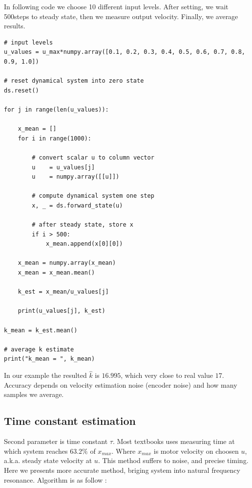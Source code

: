 \documentclass[12pt,twoside,onecolumn,openany,extrafontsizes,dvipsnames]{memoir}
\begin{document}
            In following code we choose 10 different input levels. After setting, we wait 500steps
            to steady state, then we measure output velocity. Finally, we average results.

            \begin{lstlisting}[style=python_style]
# input levels
u_values = u_max*numpy.array([0.1, 0.2, 0.3, 0.4, 0.5, 0.6, 0.7, 0.8, 0.9, 1.0])

# reset dynamical system into zero state
ds.reset()

for j in range(len(u_values)):

    x_mean = []
    for i in range(1000):

        # convert scalar u to column vector
        u    = u_values[j]
        u    = numpy.array([[u]])
        
        # compute dynamical system one step
        x, _ = ds.forward_state(u)

        # after steady state, store x
        if i > 500:
            x_mean.append(x[0][0])

    x_mean = numpy.array(x_mean)
    x_mean = x_mean.mean()

    k_est = x_mean/u_values[j]

    print(u_values[j], k_est)

k_mean = k_est.mean()

# average k estimate
print("k_mean = ", k_mean)
            \end{lstlisting}

        In our example the resulted $\hat{k}$ is $16.995$, which very close to real value $17$.
        Accuracy depends on velocity estimation noise (encoder noise) and how many samples we average.
        
        \subsection{Time constant estimation}

            Second parameter is time constant $\tau$. Most textbooks uses measuring time at which system 
            reaches $63.2\%$ of $x_{max}$. Where $x_{max}$ is motor velocity on choosen $u$, a.k.a. steady 
            state velocity at $u$. This method suffers to noise, and precise timing. Here we presents 
            more accurate method, briging system into natural frequency resonance.
            Algorithm is as follow :
        
\end{document}

